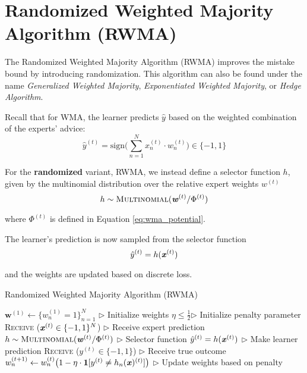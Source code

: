 \documentclass[11pt]{article}
\begin{document}
\section{Randomized Weighted Majority Algorithm (RWMA)}
The Randomized Weighted Majority Algorithm (RWMA) improves the mistake bound by introducing randomization. This algorithm can also be found under the name \textit{Generalized Weighted Majority}, \textit{Exponentiated Weighted Majority}, or \textit{Hedge Algorithm}.

Recall that for WMA, the learner predicts $\hat{y}$ based on the weighted combination of the experts' advice:
\begin{equation*}
    \hat{y}^{(t)} = \text{sign}\Big(\sum_{n=1}^Nx_n^{(t)}\cdot w_n^{(t)}\Big)\in\{-1, 1\} 
\end{equation*}

For the \textbf{randomized} variant, RWMA, we instead define a selector function $h$, given by the multinomial distribution over the relative expert weights $w^{(t)}$
\begin{equation*}
    h \sim \textsc{Multinomial}(\textbf{\textit{w}}^{(t)}/ \Phi^{(t)})
\end{equation*}

where $\Phi^{(t)}$ is defined in Equation \ref{eq:wma_potential}.

The learner's prediction is now sampled from the selector function 
\begin{equation*}
    \hat{y}^{(t)} = h(\textbf{\textit{x}}^{(t)})
\end{equation*}

and the weights are updated based on discrete loss.

\begin{algorithm}[H]
\caption{Randomized Weighted Majority Algorithm (RWMA)}
\label{algo:rwma}
\begin{algorithmic}[1]
\STATE $\textbf{w}^{(1)} \leftarrow \{w_n^{(1)}=1\}_{n=1}^N$ \hfill $\triangleright$ Initialize weights
\STATE $\eta\leq\frac{1}{2}$\hfill $\triangleright$ Initialize penalty parameter
\STATE \textsc{Receive} ($\textbf{\textit{x}}^{(t)}\in\{-1, 1\}^N$) \hfill $\triangleright$ Receive expert prediction
\STATE $h \sim \textsc{Multinomial}(\textbf{\textit{w}}^{(t)}/ \Phi^{(t)})$ \hfill $\triangleright$ Selector function
\STATE $\hat{y}^{(t)} = h(\textbf{\textit{x}}^{(t)})$ \hfill $\triangleright$ Make learner prediction
\STATE \textsc{Receive} ($y^{(t)}\in\{-1, 1\}$) \hfill $\triangleright$ Receive true outcome
\STATE $w_n^{(t+1)}\leftarrow w_n^{(t)}\big(1-\eta\cdot\textbf{1}[y^{(t)}\neq h_n(\textbf{\textit{x}})^{(t)}]\big)$ \hfill $\triangleright$ Update weights based on penalty \label{alg:rwma_weight_update}
\ENDFOR
\end{algorithmic}
\end{algorithm}
\end{document}
